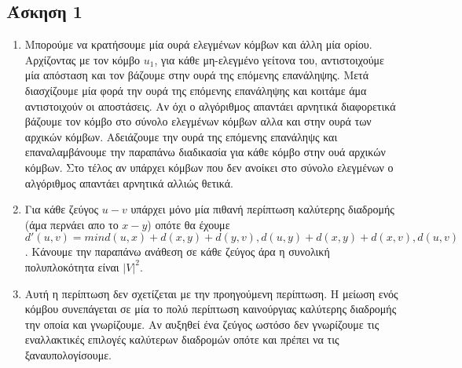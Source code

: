 \subsection*{Άσκηση 1}

\begin{enumerate}[(1)]

\item Μπορούμε να κρατήσουμε μία ουρά ελεγμένων κόμβων και άλλη μία ορίου. Αρχίζοντας με τον κόμβο $u_1$, για κάθε μη-ελεγμένο γείτονα του, αντιστοιχούμε μία απόσταση και τον βάζουμε στην ουρά της επόμενης επανάληψης. Μετά διασχίζουμε μία φορά την ουρά της επόμενης επανάληψης και κοιτάμε άμα αντιστοιχούν οι αποστάσεις. Αν όχι ο αλγόριθμος απαντάει αρνητικά διαφορετικά βάζουμε τον κόμβο στο σύνολο ελεγμένων κόμβων αλλα και στην ουρά των αρχικών κόμβων. Αδειάζουμε την ουρά της επόμενης επανάληψς και επαναλαμβάνουμε την παραπάνω διαδικασία για κάθε κόμβο στην ουά αρχικών κόμβων. Στο τέλος αν υπάρχει κόμβων που δεν ανοίκει στο σύνολο ελεγμένων ο αλγόριθμος απαντάει αρνητικά αλλιώς θετικά.

\item Για κάθε ζεύγος $u-v$ υπάρχει μόνο μία πιθανή περίπτωση καλύτερης διαδρομής (άμα περνάει απο το $x-y$) οπότε θα έχουμε $d'(u,v) = min{d(u,x)+d(x,y)+d(y,v), d(u,y)+d(x,y)+d(x,v), d(u,v)}$. Κάνουμε την
    παραπάνω ανάθεση σε κάθε ζεύγος άρα η συνολική πολυπλοκότητα είναι $|V|^2$.

\item Αυτή η περίπτωση δεν σχετίζεται με την προηγούμενη περίπτωση. Η μείωση ενός κόμβου συνεπάγεται σε μία το πολύ περίπτωση καινούργιας καλύτερης διαδρομής την οποία και γνωρίζουμε. Αν αυξηθεί ένα ζεύγος ωστόσο δεν γνωρίζουμε τις εναλλακτικές επιλογές καλύτερων διαδρομών οπότε και πρέπει να τις ξαναυπολογίσουμε.


\end{enumerate}
